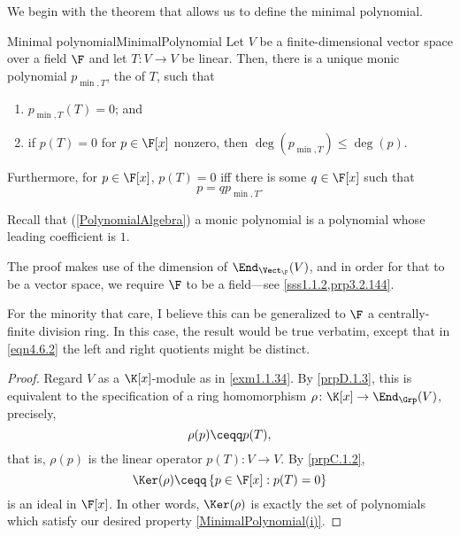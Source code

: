 We begin with the theorem that allows us to define the minimal polynomial.
\begin{thm}{Minimal polynomial}{MinimalPolynomial}
	Let $V$ be a finite-dimensional vector space over a field $\F$ and let $T\colon V\rightarrow V$ be linear.  Then, there is a unique monic polynomial $p_{\min ,T}$, the  of $T$, such that
	\begin{enumerate}
		\item \label{MinimalPolynomial(i)}$p_{\min ,T}(T)=0$; and
		\item \label{MinimalPolynomial(ii)}if $p(T)=0$ for $p\in \F [x]$ nonzero, then $\deg (p_{\min ,T})\leq \deg (p)$.
	\end{enumerate}
	Furthermore, for $p\in \F [x]$, $p(T)=0$ iff there is some $q\in \F [x]$ such that
	\begin{equation}\label{eqn4.6.2}
		p=qp_{\min ,T}.
	\end{equation}
	\begin{rmk}
		Recall that (\cref{PolynomialAlgebra}) a monic polynomial is a polynomial whose leading coefficient is $1$.
	\end{rmk}
	\begin{rmk}
		The proof makes use of the dimension of $\End _{\Vect _{\F}}(V)$, and in order for that to be a vector space, we require $\F$ to be a field---see \cref{sss1.1.2,prp3.2.144}.
	\end{rmk}
	\begin{rmk}
		For the minority that care, I believe this can be generalized to $\F$ a centrally-finite division ring.  In this case, the result would be true verbatim, except that in \eqref{eqn4.6.2} the left and right quotients might be distinct.
	\end{rmk}
	\begin{proof}
		Regard $V$ as a $\K [x]$-module as in \cref{exm1.1.34}.  By \cref{prpD.1.3}, this is equivalent to the specification of a ring homomorphism $\rho \colon \K [x]\rightarrow \End _{\Grp}(V)$, precisely,
		\begin{equation}
			\rho (p)\ceqq p(T),
		\end{equation}
		that is, $\rho (p)$ is the linear operator $p(T)\colon V\rightarrow V$.  By \cref{prpC.1.2},
		\begin{equation}\label{eqn4.6.3}
			\Ker (\rho )\ceqq \left\{ p\in \F [x]:p(T)=0\right\}
		\end{equation}
		is an ideal in $\F [x]$.  In other words, $\Ker (\rho )$ is exactly the set of polynomials which satisfy our desired property \cref{MinimalPolynomial(i)}.
		

\end{proof}
\end{thm}
